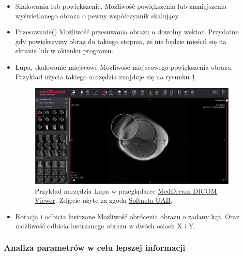 \begin{itemize}
    \item Skalowaniu lub powiększenie.
          Możliwość powiększenia lub zmniejszenia wyświetlanego obrazu o pewny współczynnik skalujący.

    \item Przesuwanie()
          Możliwość przesuwania obrazu o dowolny wektor.
          Przydatne gdy powiększymy obraz do takiego stopnia, że nie będzie mieścił się na ekranie lub w okienku programu.

    \item Lupa, skalowanie miejscowe
          Możliwość miejscowego powiększenia obrazu.
          Przykład użycia takiego narzędzia znajduje się na rysunku \ref{fig:wyswietlanie001}.

          \begin{figure}[!htbp]
              \centering
              \includegraphics[width=\textwidth]{img/wyswietlanie001.png}
              \caption{Przykład narzędzia Lupa w przeglądarce \href{https://www.softneta.com/products/meddream-dicom-viewer/}{MedDream DICOM Viewer}. Zdjęcie użyte za zgodą \href{https://www.softneta.com/}{Softneta UAB}.}
              \label{fig:wyswietlanie001}
          \end{figure}

    \item Rotacja i odbicia lustrzane
          Możliwość obrócenia obrazu o zadany kąt.
          Oraz możliwość odbicia lustrzanego obrazu w dwóch osiach X i Y.

\end{itemize}

\subsubsection{Analiza parametrów w celu lepszej informacji}

